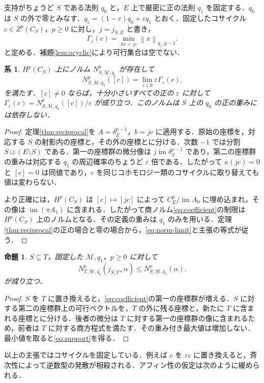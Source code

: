 \documentclass[11pt,a4paper]{article}
\numberwithin{equation}{section}
\theoremstyle{japanese}
\newtheorem{proposition}[theorem]{命題}
\newtheorem{corollary}[theorem]{系}
\theoremstyle{remark}
\newcommand{\M}{\mathcal M}
\newcommand{\im}{\operatorname{im}}
\newcommand{\norm}[1]{\left\lVert #1\right\rVert}
\begin{document}
支持がちょうど $S$ である法則 $q_0$ と，$E$ 上で厳密に正の法則 $q_1$ を固定する．$q_0$ は $S$ の外で零とみなす．$q_\varepsilon=(1-\varepsilon)q_0+\varepsilon q_1$ とおく．固定したコサイクル $c\in Z^p(C_S)$，$p\ge0$ に対し，$j=j_{S,E}$ と書き，
\begin{equation}\label{eq:primitive}
 \Gamma_\varepsilon(c)=\min_{\delta x=jc}\norm{x}_{q_\varepsilon,p-1}.
\end{equation}
と定める．補題\ref{lem:acyclic}により可行集合は空でない．

\begin{corollary}\label{cor:obstruction}
$H^p(C_S)$ 上にノルム $N^p_{S,\M,q_1}$ が存在して
\begin{equation}\label{eq:norm-limit}
 N^p_{S,\M,q_1}([c])=\lim_{\varepsilon\downarrow0}\varepsilon\Gamma_\varepsilon(c).
\end{equation}
を満たす．$[c]\ne0$ ならば，十分小さいすべての正の $\varepsilon$ に対して $\Gamma_\varepsilon(c)=N^p_{S,\M,q_1}([c])/\varepsilon$ が成り立つ．このノルムは $S$ 上の $q_0$ の正の重みには依存しない．
\end{corollary}
\begin{proof}
定理\ref{thm:reciprocal}を $A=\delta_E^{p-1}$，$b=jc$ に適用する．原始の座標を，対応する $S$ の射影内の座標と，その外の座標とに分ける．次数 $-1$ では分割 $S\sqcup(E\setminus S)$ である．第一の座標群の微分像は $j\im\delta_S^{p-1}$ であり，第二の座標群の重みは対応する $q_1$ の周辺確率のちょうど $\varepsilon$ 倍である．したがって $\kappa(jc)=0$ と $[c]=0$ は同値であり，$c$ を同じコホモロジー類のコサイクルに取り替えても値は変わらない．

より正確には，$H^p(C_S)$ は $[c]\mapsto[jc]$ によって $C_E^p/\im A_0$ に埋め込まれ，その像は $\im(\pi A_1)$ に含まれる．したがって商ノルム\eqref{eq:coefficient}の制限は $H^p(C_S)$ 上のノルムとなる．その定義の重みは $q_1$ のみを用いる．定理\ref{thm:reciprocal}の正の場合と零の場合から，\eqref{eq:norm-limit}と主張の等式が従う．
\end{proof}

\begin{proposition}\label{prop:support}
$S\subseteq T$，固定した $\M,q_1$，$p\ge0$ に対して
\begin{equation}\label{eq:support}
 N^p_{T,\M,q_1}(j_{S,T*}\alpha)\le N^p_{S,\M,q_1}(\alpha).
\end{equation}
が成り立つ．
\end{proposition}
\begin{proof}
$S$ を $T$ に置き換えると，\eqref{eq:coefficient}の第一の座標群が増える．$S$ に対する第二の座標群上の可行ベクトルを，$T$ の外に残る座標と，新たに $T$ に含まれる座標とに分ける．後者の微分は $T$ に対する第一の座標群の像に含まれるため，前者は $T$ に対する商方程式を満たす．その重み付き最大値は増加しない．最小値を取ると\eqref{eq:support}を得る．
\end{proof}
以上の主張ではコサイクルを固定している．例えば $c$ を $\varepsilon c$ に置き換えると，斉次性によって逆数型の発散が相殺される．アフィン性の仮定は次のように緩められる．
\end{document}
